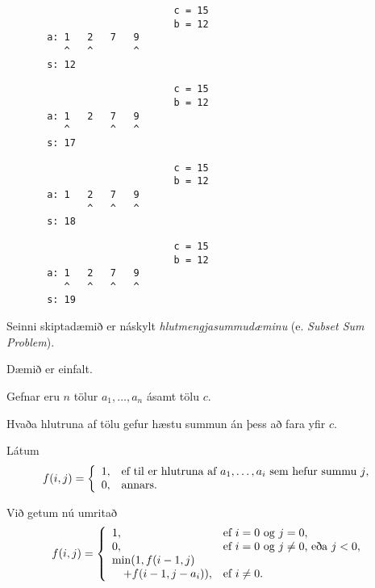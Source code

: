 { \begin{verbatim}
                             c = 15
                             b = 12
       a: 1   2   7   9
          ^   ^       ^    
       s: 12
\end{verbatim} }

{ \begin{verbatim}
                             c = 15
                             b = 12
       a: 1   2   7   9
          ^       ^   ^    
       s: 17
\end{verbatim} }

{ \begin{verbatim}
                             c = 15
                             b = 12
       a: 1   2   7   9
              ^   ^   ^    
       s: 18
\end{verbatim} }

{ \begin{verbatim}
                             c = 15
                             b = 12
       a: 1   2   7   9
          ^   ^   ^   ^    
       s: 19
\end{verbatim} }

{
	{
		\item<1-> Seinni skiptadæmið er náskylt \emph{hlutmengjasummudæminu} (e. \emph{Subset Sum Problem}).
		\item<2-> Dæmið er einfalt.
		\item<3-> Gefnar eru $n$ tölur $a_1, \dots, a_n$ ásamt tölu $c$.
		\item<4-> Hvaða hlutruna af tölu gefur hæstu summun án þess að fara yfir $c$.
	}
}

{
	\only<all:1>{\sssA}
	\only<all:2>{\sssB}
	\only<all:3>{\sssC}
	\only<all:4>{\sssD}
	\only<all:5>{\sssE}
	\only<all:6>{\sssF}
	\only<all:7>{\sssG}
	\only<all:8>{\sssHA}
	\only<all:9>{\sssHB}
	\only<all:10>{\sssHC}
	\only<all:11>{\sssHD}
	\only<all:12>{\sssI}
	\only<all:13>{\sssJ}
	\only<all:14>{\sssK}
	\only<all:15>{\sssL}
	\only<all:16>{\sssM}
}

{
	{
		\item<1-> Látum
		\[
			f(i, j) =
			\left \{
			\env{array}
			{
				{l l}
				1, & \text{ef til er hlutruna af $a_1, \dots, a_i$ sem hefur summu $j$},\\
				0, & \text{annars}.
			}
			\right .
		\]
		\item<2-> Við getum nú umritað
		\[
			f(i, j) =
			\left \{
			\env{array}
			{
				{l l}
				1, & \text{ef $i = 0$ og $j = 0$},\\
				0, & \text{ef $i = 0$ og $j \neq 0$, eða $j < 0$},\\
				\min(1, f(i - 1, j) \\
						\quad + f(i - 1, j - a_i)), & \text{ef $i \neq 0$}.
			}
			\right .
		\]
	}
}

